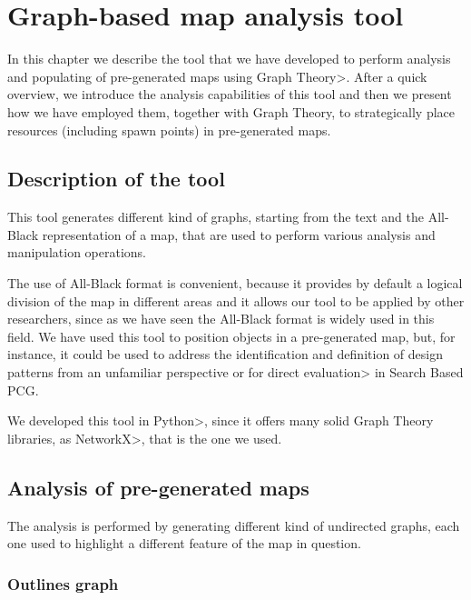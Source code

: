 \chapter{Graph-based map analysis tool}


In this chapter we describe the tool that we have developed to perform analysis and populating of pre-generated maps using \<Graph Theory>. After a quick overview, we introduce the analysis capabilities of this tool and then we present how we have employed them, together with Graph Theory, to strategically place resources (including spawn points) in pre-generated maps.


\section{Description of the tool}

This tool generates different kind of graphs, starting from the text and the All-Black representation of a map, that are used to perform various analysis and manipulation operations.

\par

The use of All-Black format is convenient, because it provides by default a logical division of the map in different areas and it allows our tool to be applied by other researchers, since as we have seen the All-Black format is widely used in this field. We have used this tool to position objects in a pre-generated map, but, for instance, it could be used to address the identification and definition of design patterns from an unfamiliar perspective or for \<direct evaluation> in Search Based PCG.

\par 

We developed this tool in \<Python>, since it offers many solid Graph Theory libraries, as \<NetworkX>, that is the one we used.


\section{Analysis of pre-generated maps}

The analysis is performed by generating different kind of undirected graphs, each one used to highlight a different feature of the map in question.

\subsection{Outlines graph}

